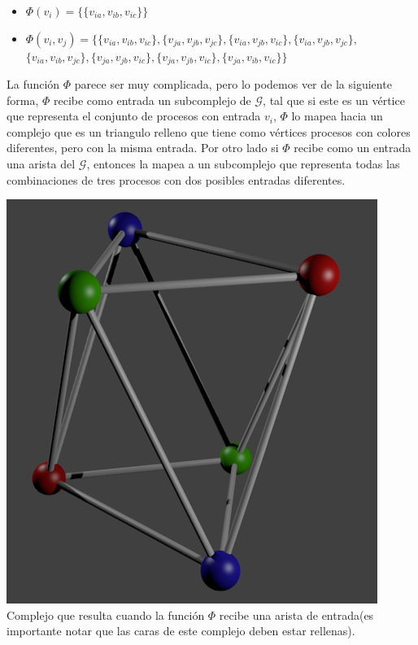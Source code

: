 \documentclass{article}
\begin{document}
\begin{enumerate}
{      \begin{itemize}
        
        \item{
            $\Phi(v_i) = \{\{v_{ia}, v_{ib}, v_{ic}\}\}$
          }

          \item{
              $\Phi({v_i,v_j}) =  \{\{v_{ia}, v_{ib}, v_{ic}\},
              \{v_{ja}, v_{jb}, v_{jc}\}, \{v_{ia}, v_{jb}, v_{ic}\},
              \{v_{ia}, v_{jb}, v_{jc}\}, $\\
              $\{v_{ia}, v_{ib}, v_{jc}\},
              \{v_{ja}, v_{jb}, v_{ic}\}, \{v_{ja}, v_{jb}, v_{ic}\},
              \{v_{ja},v_{ib}, v_{ic}\}
              \}$ \\
            }
        
      \end{itemize}

      La función $\Phi$ parece ser muy complicada, pero lo podemos ver
      de la siguiente forma, $\Phi$ recibe como entrada un
      subcomplejo de $\mathcal{G}$, tal que si este es un vértice que
      representa el conjunto de procesos con entrada $v_i$, $\Phi$ lo
      mapea hacia un complejo que es un triangulo relleno que tiene
      como vértices procesos con colores diferentes, pero con la misma
      entrada. Por otro lado si $\Phi$ recibe como un entrada una
      arista del $\mathcal{G}$, entonces la mapea a un subcomplejo que
      representa todas las combinaciones de tres procesos con dos
      posibles entradas diferentes.\\
      
      \begin{center}
        \includegraphics[scale=0.4]{phi_map.png}
        \\Complejo que resulta cuando la función $\Phi$ recibe una
        arista de entrada(es importante notar que las caras de este
        complejo deben estar rellenas).\\
      \end{center}
    
}
\end{enumerate}
\end{document}

